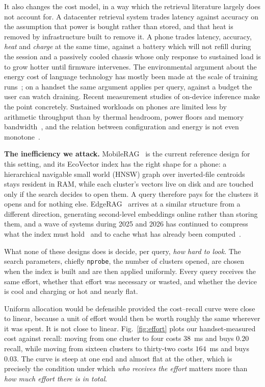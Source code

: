 \documentclass[journal]{IEEEtran}
\newcommand{\nprobe}{\texttt{nprobe}}
\begin{document}
It also changes the cost model, in a way which the retrieval literature
largely does not account for. A datacenter retrieval system trades latency
against accuracy on the assumption that power is bought rather than stored,
and that heat is removed by infrastructure built to remove it. A phone
trades latency, accuracy, \emph{heat} and \emph{charge} at the same time,
against a battery which will not refill during the session and a passively
cooled chassis whose only response to sustained load is to grow hotter
until firmware intervenes. The environmental argument about the energy
cost of language technology has mostly been made at the scale of training
runs~\cite{strubell2019energy,schwartz2020greenai}; on a handset the same
argument applies per query, against a budget the user can watch draining.
Recent measurement studies of on-device inference make the point
concretely. Sustained workloads on phones are limited less by arithmetic
throughput than by thermal headroom, power floors and memory
bandwidth~\cite{tummalapalli2026edgeinference,cai2026npuready}, and the
relation between configuration and energy is not even
monotone~\cite{ehsani2026sustainability}.

\textbf{The inefficiency we attack.} MobileRAG~\cite{park2025mobilerag} is
the current reference design for this setting, and its EcoVector index has
the right shape for a phone: a hierarchical navigable small world (HNSW)
graph over inverted-file centroids stays resident in RAM, while each
cluster's vectors live on disk and are touched only if the search decides
to open them. A query therefore pays for the clusters it opens and for
nothing else. EdgeRAG~\cite{seemakhupt2024edgerag} arrives at a similar
structure from a different direction, generating second-level embeddings
online rather than storing them, and a wave of systems during 2025 and 2026
has continued to compress what the index must
hold~\cite{wang2025leann,killingback2026unified} and to cache what has
already been computed~\cite{liu2026percache}.

What none of these designs does is decide, per query, \emph{how hard to
look}. The search parameters, chiefly \nprobe, the number of clusters
opened, are chosen when the index is built and are then applied uniformly.
Every query receives the same effort, whether that effort was necessary or
wasted, and whether the device is cool and charging or hot and nearly flat.

Uniform allocation would be defensible provided the cost--recall curve were
close to linear, because a unit of effort would then be worth roughly the
same wherever it was spent. It is not close to linear. Fig.~\ref{fig:effort}
plots our handset-measured cost against recall: moving from one cluster to
four costs $38$~ms and buys $0.20$ recall, while moving from sixteen
clusters to thirty-two costs $164$~ms and buys $0.03$. The curve is steep
at one end and almost flat at the other, which is precisely the condition
under which \emph{who receives the effort} matters more than \emph{how much
effort there is in total}.
\end{document}

